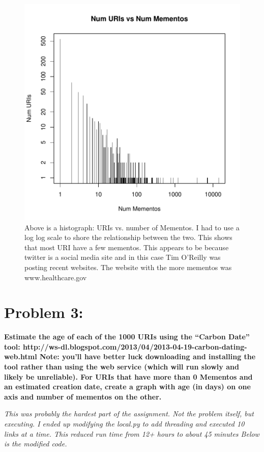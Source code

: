 \documentclass{article}
\begin{document}
\begin{figure}[h!]
    \includegraphics[width=\textwidth]{prob2}
    \caption{Above is a histograph: URIs vs. number of Mementos.  I had to use a log log scale to shore the relationship between the two.  This shows that most URI have a few mementos.  This appears to be because twitter is a social media site and in this case Tim O'Reilly was posting recent websites.  The website with the more mementos was www.healthcare.gov}
\end{figure}


\newpage
\section{Problem 3:}
\label{Problem 3}

{\bf Estimate the age of each of the 1000 URIs using the ``Carbon Date'' tool:
\newline\newline
http://ws-dl.blogspot.com/2013/04/2013-04-19-carbon-dating-web.html
\newline\newline
Note: you'll have better luck downloading and installing the tool rather than using the web service (which will run slowly and likely be unreliable).
\newline\newline
For URIs that have more than 0 Mementos and an estimated creation date, create a graph with age (in days) on one axis and number of mementos on the other.
\newline
\newline


}
{\it 
This was probably the hardest part of the assignment.  Not the problem itself, but executing.  I ended up modifying the local.py to add threading and executed 10 links at a time.  This reduced run time from 12+ hours to about 45 minutes  Below is the modified code.  
}
\end{document}
